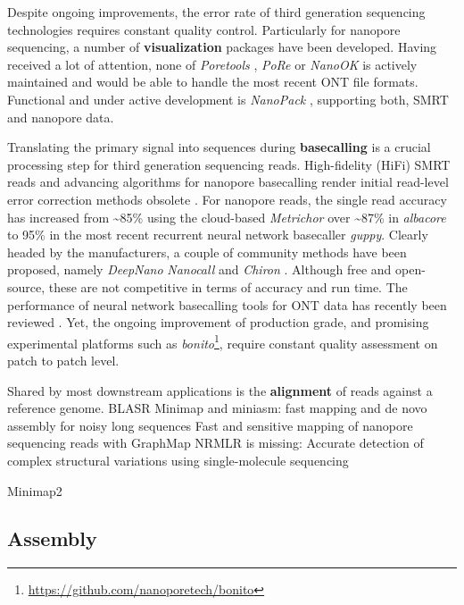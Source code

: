 Despite ongoing improvements, the error rate of third generation sequencing technologies requires constant quality control. Particularly for nanopore sequencing, a number of \textbf{visualization} packages have been developed.
Having received a lot of attention, none of \textit{Poretools} \cite{Loman2014},
\textit{PoRe} \cite{Watson2014} or \textit{NanoOK} \cite{Leggett2016} is actively maintained and would be able to handle the most recent ONT file formats.
Functional and under active development is \textit{NanoPack} \cite{DeCoster2018}, supporting both, SMRT and nanopore data.

Translating the primary signal into sequences during \textbf{basecalling} is a crucial processing step for third generation sequencing reads.
High-fidelity (HiFi) SMRT reads and advancing algorithms for nanopore basecalling render initial read-level error correction methods obsolete \cite{Koren2012, Hackl2014, Goodwin2015}.
For nanopore reads, the single read accuracy has increased from \textasciitilde85\% using the cloud-based \textit{Metrichor} over \textasciitilde87\% in \textit{albacore} to 95\% in the most recent recurrent neural network basecaller \textit{guppy}.
Clearly headed by the manufacturers, a couple of community methods have been proposed, namely 
\textit{DeepNano} \cite{Boza2017} \textit{Nanocall} \cite{David2017} and \textit{Chiron} \cite{Teng2018}.
Although free and open-source, these are not competitive in terms of accuracy and run time.
The performance of neural network basecalling tools for ONT data has recently been reviewed \cite{Wick2019}.
Yet, the ongoing improvement of production grade, and promising experimental platforms such as \textit{bonito}\footnote{\url{https://github.com/nanoporetech/bonito}}, require constant quality assessment on patch to patch level.

Shared by most downstream applications is the \textbf{alignment} of reads against a reference genome.
BLASR \cite{Chaisson2012}
Minimap and miniasm: fast mapping and de novo assembly for noisy long sequences \cite{Li2016}
Fast and sensitive mapping of nanopore sequencing reads with GraphMap \cite{Sovic2016}
NRMLR is missing: Accurate detection of complex structural variations using single-molecule sequencing \cite{Sedlazeck2018}

Minimap2 \cite{Li2018}


\subsection{Assembly}
\label{subsec:state_of_art:assembly}

